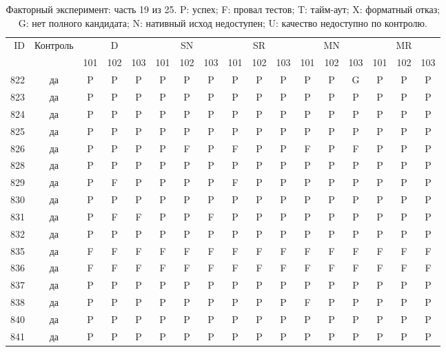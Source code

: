 \begin{table}[p]\centering\footnotesize
\setlength{\tabcolsep}{3pt}
\caption{Факторный эксперимент: часть 19 из 25. P: успех; F: провал тестов; T: тайм-аут; X: форматный отказ; G: нет полного кандидата; N: нативный исход недоступен; U: качество недоступно по контролю.}
\begin{tabular*}{\textwidth}{@{\extracolsep{\fill}}rcccccccccccccccc}\toprule
ID & Контроль & \multicolumn{3}{c}{D} & \multicolumn{3}{c}{SN} & \multicolumn{3}{c}{SR} & \multicolumn{3}{c}{MN} & \multicolumn{3}{c}{MR}\\
\cmidrule(lr){3-5}\cmidrule(lr){6-8}\cmidrule(lr){9-11}\cmidrule(lr){12-14}\cmidrule(lr){15-17}
 & & 101 & 102 & 103 & 101 & 102 & 103 & 101 & 102 & 103 & 101 & 102 & 103 & 101 & 102 & 103\\\midrule
822 & да & P & P & P & P & P & P & P & P & P & P & P & G & P & P & P\\
823 & да & P & P & P & P & P & P & P & P & P & P & P & P & P & P & P\\
824 & да & P & P & P & P & P & P & P & P & P & P & P & P & P & P & P\\
825 & да & P & P & P & P & P & P & P & P & P & P & P & P & P & P & P\\
826 & да & P & P & P & P & F & P & F & P & P & F & P & F & P & P & P\\
828 & да & P & P & P & P & P & P & P & P & P & P & P & P & P & P & P\\
829 & да & P & F & P & P & P & P & F & P & P & P & P & P & P & P & P\\
830 & да & P & P & P & P & P & P & P & P & P & P & P & P & P & P & P\\
831 & да & P & F & F & P & P & F & P & P & P & P & P & P & P & P & P\\
832 & да & P & P & P & P & P & P & P & P & P & P & P & P & P & P & P\\
835 & да & F & F & F & F & F & F & F & F & F & F & F & F & F & F & F\\
836 & да & F & F & F & F & F & F & F & F & F & F & F & F & F & F & F\\
837 & да & P & P & P & P & P & P & P & P & P & P & P & P & P & P & P\\
838 & да & P & P & P & P & P & P & P & P & P & F & P & P & P & P & P\\
840 & да & P & P & P & P & P & P & P & P & P & P & P & P & P & P & P\\
841 & да & P & P & P & P & P & P & P & P & P & P & P & P & P & P & P\\

\end{tabular*}
\end{table}
